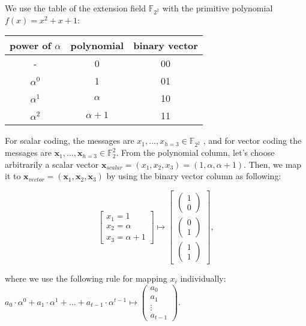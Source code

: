 We use the table of the extension field $\ensuremath{\mathbb{F}}_{2^{2}}$
with the primitive polynomial $f(x)=x^{2}+x+1$:
\begin{center}
\begin{tabular}{|c|c|c|}
\hline 
power of $\alpha$ & polynomial & binary vector\tabularnewline
\hline 
- & 0 & 00\tabularnewline
\hline 
$\alpha^{0}$ & 1 & 01\tabularnewline
\hline 
$\alpha^{1}$ & $\alpha$ & 10\tabularnewline
\hline 
$\alpha^{2}$ & $\alpha+1$ & 11\tabularnewline
\hline 
\end{tabular}
\par\end{center}

For scalar coding, the messages are $x_{1},\ldots,x_{h=3}\in\ensuremath{\mathbb{F}}_{2^{2}}$
, and for vector coding the messages are $\boldsymbol{x}_{1},\ldots,\boldsymbol{x}_{h=3}\in\ensuremath{\mathbb{F}}_{2}^{2}$.
From the polynomial column, let's choose arbitrarily a scalar vector
$\boldsymbol{x}_{scalar}=(x_{1},x_{2},x_{3})=(1,\alpha,\alpha+1)$.
Then, we map it to $\boldsymbol{x}_{vector}=(\boldsymbol{x}_{1},\boldsymbol{x}_{2},\boldsymbol{x}_{3})$
by using the binary vector column as following:

\[
\left[\begin{array}{c}
x_{1}=1\\
x_{2}=\alpha\\
x_{3}=\alpha+1
\end{array}\right]\mapsto\left[\begin{array}{c}
\left(\begin{array}{c}
1\\
0
\end{array}\right)\\
\left(\begin{array}{c}
0\\
1
\end{array}\right)\\
\left(\begin{array}{c}
1\\
1
\end{array}\right)
\end{array}\right],
\]

where we use the following rule for mapping $x_{i}$ individually:
$a_{0}\cdot\alpha^{0}+a_{1}\cdot\alpha^{1}+\ldots+a_{t-1}\cdot\alpha^{t-1}\mapsto\left(\begin{array}{c}
a_{0}\\
a_{1}\\
\vdots\\
a_{t-1}
\end{array}\right)$.

